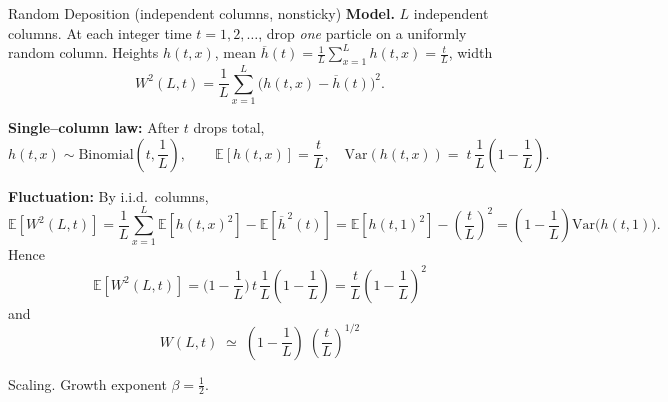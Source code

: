 \documentclass[9pt,table,xcolor=dvipsnames]{beamer}
\begin{document}
\begin{frame}[t]{Random Deposition (independent columns, nonsticky)}
  \small \textbf{Model.} $L$ independent columns. At each integer time $t =
  1,2,\dots$, drop \emph{one} particle on a uniformly random column. Heights
  $h(t,x)$, mean $\overline h(t)=\frac1L\sum_{x=1}^L h(t,x) = \frac{t}{L}$,
  width
  \[
    W^2(L,t)=\frac1L\sum_{x=1}^L \big(h(t,x)-\overline h(t)\big)^2.
  \]

  \pause\medskip\textbf{Single--column law:} After $t$ drops total,
  \[
    h(t,x)\sim \mathrm{Binomial}\!\left(t,\frac1L\right),\qquad
    \mathbb E[h(t,x)]=\frac{t}{L},\quad \mathrm{Var}(h(t,x))=\;t\,\frac1L\!\left(1-\frac1L\right).
  \]

  \pause\medskip\textbf{Fluctuation:} By i.i.d.\ columns,
  \[
    \mathbb E\!\left[W^2(L,t)\right]
    =\frac1L\sum_{x=1}^L\mathbb E\left[h(t,x)^2\right] - \mathbb E\left[\overline h^{\,2}(t)\right]
    =\mathbb E\left[h(t,1)^2\right] - \left(\frac{t}{L}\right)^2
    =\left(1-\frac1L\right) \mathrm{Var}\!\big(h(t,1)\big).
  \]
  Hence
  \[
    \boxed{\;\mathbb E\!\left[W^2(L,t)\right]
    =\Big(1-\frac1L\Big)\,t\,\frac1L\!\left(1-\frac1L\right)
    =\frac{t}{L}\left(1-\frac1L\right)^{\!2}\;}
  \]
  and
  \[
    \boxed{\,W(L,t)\; \simeq \;\left(1-\frac1L\right)\;\left(\frac{t}{L}\right)^{1/2}\,}
  \]

  \medskip \alert{Scaling.} Growth exponent \( \displaystyle \beta = \frac12\).

\end{frame}
\end{document}
